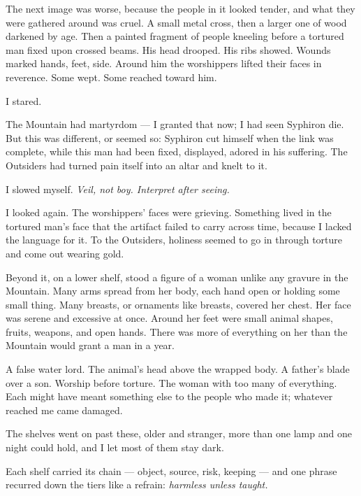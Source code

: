 The next image was worse, because the people in it looked tender, and what they were gathered around was cruel. A small metal cross, then a larger one of wood darkened by age. Then a painted fragment of people kneeling before a tortured man fixed upon crossed beams. His head drooped. His ribs showed. Wounds marked hands, feet, side. Around him the worshippers lifted their faces in reverence. Some wept. Some reached toward him.\par

I stared.\par

The Mountain had martyrdom --- I granted that now; I had seen Syphiron die. But this was different, or seemed so: Syphiron cut himself when the link was complete, while this man had been fixed, displayed, adored in his suffering. The Outsiders had turned pain itself into an altar and knelt to it.\par

I slowed myself. \textit{Veil, not boy. Interpret after seeing.}\par

I looked again. The worshippers' faces were grieving. Something lived in the tortured man's face that the artifact failed to carry across time, because I lacked the language for it. To the Outsiders, holiness seemed to go in through torture and come out wearing gold.\par

Beyond it, on a lower shelf, stood a figure of a woman unlike any gravure in the Mountain. Many arms spread from her body, each hand open or holding some small thing. Many breasts, or ornaments like breasts, covered her chest. Her face was serene and excessive at once. Around her feet were small animal shapes, fruits, weapons, and open hands. There was more of everything on her than the Mountain would grant a man in a year.\par

A false water lord. The animal's head above the wrapped body. A father's blade over a son. Worship before torture. The woman with too many of everything. Each might have meant something else to the people who made it; whatever reached me came damaged.\par

The shelves went on past these, older and stranger, more than one lamp and one night could hold, and I let most of them stay dark.\par

Each shelf carried its chain --- object, source, risk, keeping --- and one phrase recurred down the tiers like a refrain: \textit{harmless unless taught.}\par

